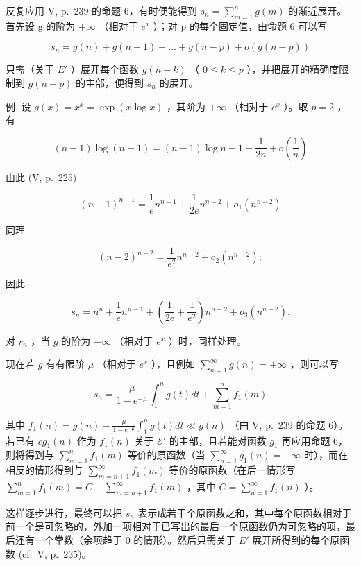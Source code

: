 反复应用 V, p.~239 的命题 6，有时便能得到 \(s_{n} = \sum_{m=1}^{n} g(m)\) 的渐近展开。首先设 g 的阶为 \(+\infty\) （相对于 \(e^{x}\) ）；对 p 的每个固定值，由命题 6 可以写

\[
s _ {n} = g (n) + g (n - 1) + \dots + g (n - p) + o (g (n - p))
\]

只需（关于 \(E'\) ）展开每个函数 \(g(n-k)\) （ \(0 \leqslant k \leqslant p\) ），并把展开的精确度限制到 \(g(n-p)\) 的主部，便得到 \(s_{n}\) 的展开。

例. 设 \(g(x) = x^{x} = \exp (x\log x)\) ，其阶为 \(+\infty\) （相对于 \(e^x\) ）。取 \(p = 2\) ，有

\[
(n - 1) \log (n - 1) = (n - 1) \log n - 1 + \frac {1}{2 n} + o \left(\frac {1}{n}\right)
\]

由此 (V, p.~225)

\[
(n - 1) ^ {n - 1} = \frac {1}{e} n ^ {n - 1} + \frac {1}{2 e} n ^ {n - 2} + o _ {1} (n ^ {n - 2})
\]

同理

\[
(n - 2) ^ {n - 2} = \frac {1}{e ^ {2}} n ^ {n - 2} + o _ {2} (n ^ {n - 2});
\]

因此

\[
s _ {n} = n ^ {n} + \frac {1}{e} n ^ {n - 1} + \left(\frac {1}{2 e} + \frac {1}{e ^ {2}}\right) n ^ {n - 2} + o _ {3} (n ^ {n - 2}).
\]

对 \(r_n\) ，当 \(g\) 的阶为 \(-\infty\) （相对于 \(e^x\) ）时，同样处理。

现在若 \(g\) 有有限阶 \(\mu\) （相对于 \(e^x\) ），且例如 \(\sum_{n=1}^{\infty} g(n) = +\infty\) ，则可以写

\[
s _ {n} = \frac {\mu}{1 - e ^ {- \mu}} \int_ {1} ^ {n} g (t) d t + \sum_ {m = 1} ^ {n} f _ {1} (m)
\]

其中 \(f_{1}(n) = g(n) - \frac{\mu}{1 - e^{-\mu}}\int_{1}^{n}g(t)dt \ll g(n)\) （由 V, p.~239 的命题 6）。若已有 \(cg_{1}(n)\) 作为 \(f_{1}(n)\) 关于 \(\mathcal{E}'\) 的主部，且若能对函数 \(g_{1}\) 再应用命题 6，则将得到与 \(\sum_{m=1}^{n}f_{1}(m)\) 等价的原函数（当 \(\sum_{n=1}^{\infty}g_{1}(n) = +\infty\) 时），而在相反的情形得到与 \(\sum_{m=n+1}^{\infty}f_{1}(m)\) 等价的原函数（在后一情形写 \(\sum_{m=1}^{n}f_{1}(m) = C - \sum_{m=n+1}^{\infty}f_{1}(m)\) ，其中 \(C = \sum_{n=1}^{\infty}f_{1}(n)\) ）。

这样逐步进行，最终可以把 \(s_{n}\) 表示成若干个原函数之和，其中每个原函数相对于前一个是可忽略的，外加一项相对于已写出的最后一个原函数仍为可忽略的项，最后还有一个常数（余项趋于 0 的情形）。然后只需关于 \(E'\) 展开所得到的每个原函数 (cf.~V, p.~235)。

